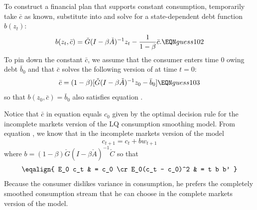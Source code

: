 To construct a financial plan that supports constant consumption, temporarily take $\bar c$ as known, substitute  into
 and solve for a state-dependent debt function $b(z_t)$:
$$ b(z_t, \bar c) =  \check G(I-\beta \check A)^{-1} z_t - {\frac{1}{1-\beta}} \bar c . \EQN guess102 $$
To pin down the constant $\bar c$, we assume that the consumer enters time $0$ owing debt $\bar b_0$ and that $\bar c$ solves  the following version of  at time $t=0$:
$$ \bar c = (1 -\beta) [ \check G(I-\beta \check A)^{-1} z_0 -  \bar b_0 ]  \EQN guess103 $$
so that $b(z_0, \bar c) = \bar b_0$ also satisfies equation .
 




Notice that $\bar c$ in equation  equals $c_0$ given by the optimal decision rule  for the incomplete markets version
of the LQ consumption smoothing model.   From equation , we know that in the incomplete markets version of the model
$$ c_{t+1} = c_t + b w_{t+1} $$
where $b = (1-\beta) \check G (I - \beta \check A)^{-1} \check C $
so that 
$$ \eqalign{ E_0 c_t & = c_0 \cr
              E_0(c_t  - c_0)^2 & = t b b' } $$
Because the consumer dislikes variance in consumption, he prefers the completely smoothed   consumption stream  that he can choose in the complete markets version of the model.


\medskip


\bye
